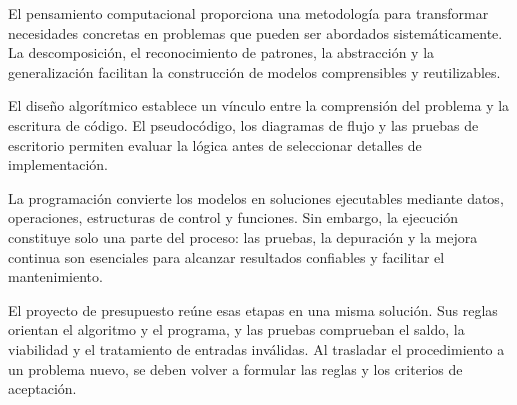 
El pensamiento computacional proporciona una metodología para transformar necesidades concretas en problemas que pueden ser abordados sistemáticamente. La descomposición, el reconocimiento de patrones, la abstracción y la generalización facilitan la construcción de modelos comprensibles y reutilizables.

El diseño algorítmico establece un vínculo entre la comprensión del problema y la escritura de código. El pseudocódigo, los diagramas de flujo y las pruebas de escritorio permiten evaluar la lógica antes de seleccionar detalles de implementación.

La programación convierte los modelos en soluciones ejecutables mediante datos, operaciones, estructuras de control y funciones. Sin embargo, la ejecución constituye solo una parte del proceso: las pruebas, la depuración y la mejora continua son esenciales para alcanzar resultados confiables y facilitar el mantenimiento.

El proyecto de presupuesto reúne esas etapas en una misma solución. Sus reglas orientan el algoritmo y el programa, y las pruebas comprueban el saldo, la viabilidad y el tratamiento de entradas inválidas. Al trasladar el procedimiento a un problema nuevo, se deben volver a formular las reglas y los criterios de aceptación.
